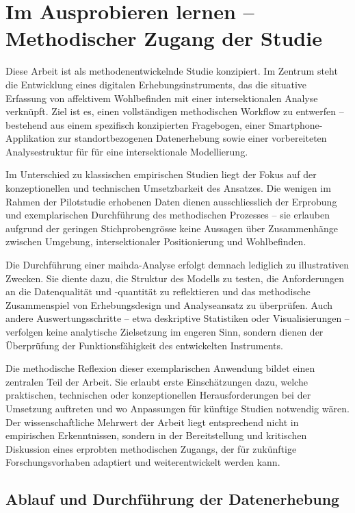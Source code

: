 \section{Im Ausprobieren lernen -- Methodischer Zugang der Studie} \label{sec:methodenentwickelnd}

Diese Arbeit ist als methodenentwickelnde Studie konzipiert. Im Zentrum steht die Entwicklung eines digitalen Erhebungsinstruments, das die situative Erfassung von affektivem Wohlbefinden mit einer intersektionalen Analyse verknüpft. Ziel ist es, einen vollständigen methodischen Workflow zu entwerfen -- bestehend aus einem spezifisch konzipierten Fragebogen, einer Smartphone-Applikation zur standortbezogenen Datenerhebung sowie einer vorbereiteten Analysestruktur für für eine intersektionale Modellierung.

Im Unterschied zu klassischen empirischen Studien liegt der Fokus auf der konzeptionellen und technischen Umsetzbarkeit des Ansatzes. Die wenigen im Rahmen der Pilotstudie erhobenen Daten dienen ausschliesslich der Erprobung und exemplarischen Durchführung des methodischen Prozesses -- sie erlauben aufgrund der geringen Stichprobengrösse keine  Aussagen über Zusammenhänge zwischen Umgebung, intersektionaler Positionierung und Wohlbefinden.

Die Durchführung einer \acrshort{maihda}-Analyse erfolgt demnach lediglich zu illustrativen Zwecken. Sie diente dazu, die Struktur des Modells zu testen, die Anforderungen an die Datenqualität und -quantität zu reflektieren und das methodische Zusammenspiel von Erhebungsdesign und Analyseansatz zu überprüfen. Auch andere Auswertungsschritte -- etwa deskriptive Statistiken oder Visualisierungen -- verfolgen keine analytische Zielsetzung im engeren Sinn, sondern dienen der Überprüfung der Funktionsfähigkeit des entwickelten Instruments.

Die methodische Reflexion dieser exemplarischen Anwendung bildet einen zentralen Teil der Arbeit. Sie erlaubt erste Einschätzungen dazu, welche praktischen, technischen oder konzeptionellen Herausforderungen bei der Umsetzung auftreten und wo Anpassungen für künftige Studien notwendig wären. Der wissenschaftliche Mehrwert der Arbeit liegt entsprechend nicht in empirischen Erkenntnissen, sondern in der Bereitstellung und kritischen Diskussion eines erprobten methodischen Zugangs, der für zukünftige Forschungsvorhaben adaptiert und weiterentwickelt werden kann.

\subsection{Ablauf und Durchführung der Datenerhebung}


